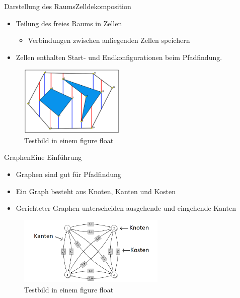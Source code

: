 \documentclass[t,aspectratio=169,dvipsnames]{beamer}
\begin{document}
\begin{frame}{Darstellung des Raums}{Zelldekomposition}
	\begin{itemize}
		\item Teilung des freies Raums in Zellen
		\begin{itemize}
			\item Verbindungen zwischen anliegenden Zellen speichern
		\end{itemize}
	    \item Zellen enthalten Start- und Endkonfigurationen beim Pfadfindung.
	\end{itemize}
	
	\begin{figure}
		\includegraphics[width=5.0cm]{images/Bild4.png}
		\caption{Testbild in einem figure float} 
	\end{figure}
\end{frame}

\begin{frame}{Graphen}{Eine Einführung}
	\begin{itemize}
		\item Graphen sind gut für Pfadfindung
		\item Ein Graph besteht aus Knoten, Kanten und Kosten
		\item Gerichteter Graphen unterscheiden ausgehende und eingehende Kanten
	\end{itemize}
	
	\begin{figure}
		\includegraphics[width=7.0cm]{images/kk_graph_S6.png}
		\caption{Testbild in einem figure float} 
	\end{figure}
\end{frame}
\end{document}
